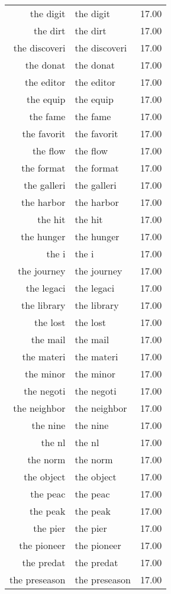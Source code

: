 \begin{table}[ht]
\begin{tabular}{rlr}
  the digit & the digit & 17.00 \\ 
  the dirt & the dirt & 17.00 \\ 
  the discoveri & the discoveri & 17.00 \\ 
  the donat & the donat & 17.00 \\ 
  the editor & the editor & 17.00 \\ 
  the equip & the equip & 17.00 \\ 
  the fame & the fame & 17.00 \\ 
  the favorit & the favorit & 17.00 \\ 
  the flow & the flow & 17.00 \\ 
  the format & the format & 17.00 \\ 
  the galleri & the galleri & 17.00 \\ 
  the harbor & the harbor & 17.00 \\ 
  the hit & the hit & 17.00 \\ 
  the hunger & the hunger & 17.00 \\ 
  the i & the i & 17.00 \\ 
  the journey & the journey & 17.00 \\ 
  the legaci & the legaci & 17.00 \\ 
  the library & the library & 17.00 \\ 
  the lost & the lost & 17.00 \\ 
  the mail & the mail & 17.00 \\ 
  the materi & the materi & 17.00 \\ 
  the minor & the minor & 17.00 \\ 
  the negoti & the negoti & 17.00 \\ 
  the neighbor & the neighbor & 17.00 \\ 
  the nine & the nine & 17.00 \\ 
  the nl & the nl & 17.00 \\ 
  the norm & the norm & 17.00 \\ 
  the object & the object & 17.00 \\ 
  the peac & the peac & 17.00 \\ 
  the peak & the peak & 17.00 \\ 
  the pier & the pier & 17.00 \\ 
  the pioneer & the pioneer & 17.00 \\ 
  the predat & the predat & 17.00 \\ 
  the preseason & the preseason & 17.00 \\ 

\end{tabular}
\end{table}
